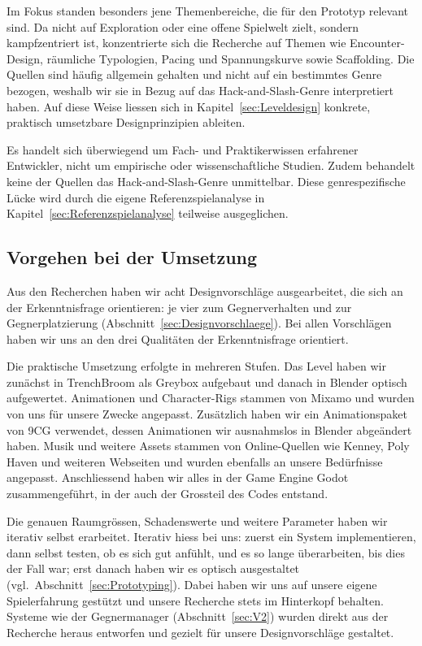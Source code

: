 \documentclass[../Main.tex]{subfiles}
\begin{document}
Im Fokus standen besonders jene Themenbereiche, die für den Prototyp relevant sind. Da  nicht auf Exploration oder eine offene Spielwelt zielt, sondern kampfzentriert ist, konzentrierte sich die Recherche auf Themen wie Encounter-Design, räumliche Typologien, Pacing und Spannungskurve sowie Scaffolding. Die Quellen sind häufig allgemein gehalten und nicht auf ein bestimmtes Genre bezogen, weshalb wir sie in Bezug auf das Hack-and-Slash-Genre interpretiert haben. Auf diese Weise liessen sich in Kapitel~\ref{sec:Leveldesign} konkrete, praktisch umsetzbare Designprinzipien ableiten.

Es handelt sich überwiegend um Fach- und Praktikerwissen erfahrener Entwickler, nicht um empirische oder wissenschaftliche Studien. Zudem behandelt keine der Quellen das Hack-and-Slash-Genre unmittelbar. Diese genrespezifische Lücke wird durch die eigene Referenzspielanalyse in Kapitel~\ref{sec:Referenzspielanalyse} teilweise ausgeglichen.

\subsection{Vorgehen bei der Umsetzung} \label{sec:VorgehenUmsetzung}
Aus den Recherchen haben wir acht Designvorschläge ausgearbeitet, die sich an der Erkenntnisfrage orientieren: je vier zum Gegnerverhalten und zur Gegnerplatzierung (Abschnitt~\ref{sec:Designvorschlaege}). Bei allen Vorschlägen haben wir uns an den drei Qualitäten der Erkenntnisfrage orientiert.

Die praktische Umsetzung erfolgte in mehreren Stufen. Das Level haben wir zunächst in TrenchBroom als Greybox aufgebaut und danach in Blender optisch aufgewertet. Animationen und Character-Rigs stammen von Mixamo und wurden von uns für unsere Zwecke angepasst. Zusätzlich haben wir ein Animationspaket von 9CG verwendet, dessen Animationen wir ausnahmslos in Blender abgeändert haben. Musik und weitere Assets stammen von Online-Quellen wie Kenney, Poly Haven und weiteren Webseiten und wurden ebenfalls an unsere Bedürfnisse angepasst. Anschliessend haben wir alles in der Game Engine Godot zusammengeführt, in der auch der Grossteil des Codes entstand.

Die genauen Raumgrössen, Schadenswerte und weitere Parameter haben wir iterativ selbst erarbeitet. Iterativ hiess bei uns: zuerst ein System implementieren, dann selbst testen, ob es sich gut anfühlt, und es so lange überarbeiten, bis dies der Fall war; erst danach haben wir es optisch ausgestaltet (vgl.\ Abschnitt~\ref{sec:Prototyping}). Dabei haben wir uns auf unsere eigene Spielerfahrung gestützt und unsere Recherche stets im Hinterkopf behalten. Systeme wie der Gegnermanager (Abschnitt~\ref{sec:V2}) wurden direkt aus der Recherche heraus entworfen und gezielt für unsere Designvorschläge gestaltet.
\end{document}
